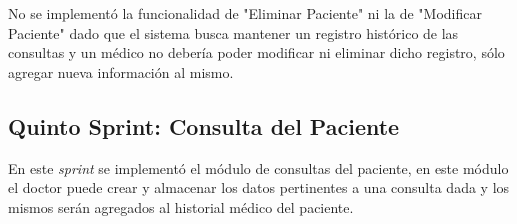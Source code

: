 \begin{enumerate}
\begin{itemize}
            No se implementó la funcionalidad de "Eliminar Paciente" ni la de "Modificar Paciente" dado que el sistema busca mantener un registro histórico de las consultas y un médico no debería poder modificar ni eliminar dicho registro, sólo agregar nueva información al mismo.
            
        \end{itemize}
        
    \end{enumerate}
        
        
    \subsection{Quinto Sprint: Consulta del Paciente}
    
    En este \textit{sprint} se implementó el módulo de consultas del paciente, en este módulo el doctor puede crear y almacenar los datos pertinentes a una consulta dada y los mismos serán agregados al historial médico del paciente.
    
